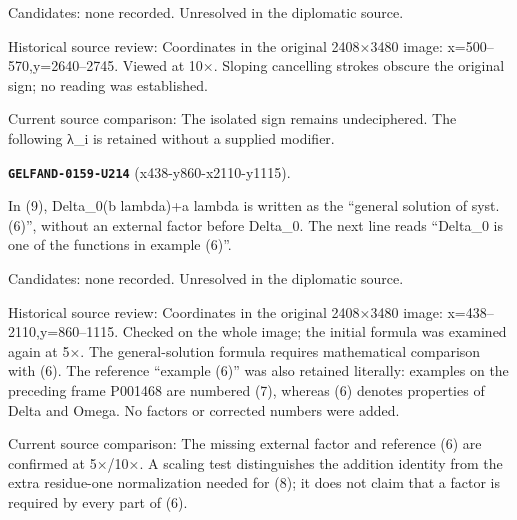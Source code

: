 Candidates: none recorded. Unresolved in the diplomatic source.\par
Historical source review: Coordinates in the original 2408×3480 image: x=500–570,y=2640–2745. Viewed at 10×. Sloping cancelling strokes obscure the original sign; no reading was established.\par
Current source comparison: The isolated sign remains undeciphered. The following λ\_i is retained without a supplied modifier.\par\medskip
\par\noindent\leavevmode{}\label{GELFAND-0159-U214}\label{GELFAND-P001469:x438-y860-x2110-y1115}\textbf{\texttt{GELFAND-0159-U214}} (x438-y860-x2110-y1115).\nopagebreak[4]\par
In (9), Delta\_0(b lambda)+a lambda is written as the “general solution of syst. (6)”, without an external factor before Delta\_0. The next line reads “Delta\_0 is one of the functions in example (6)”.\par
Candidates: none recorded. Unresolved in the diplomatic source.\par
Historical source review: Coordinates in the original 2408×3480 image: x=438–2110,y=860–1115. Checked on the whole image; the initial formula was examined again at 5×. The general-solution formula requires mathematical comparison with (6). The reference “example (6)” was also retained literally: examples on the preceding frame P001468 are numbered (7), whereas (6) denotes properties of Delta and Omega. No factors or corrected numbers were added.\par
Current source comparison: The missing external factor and reference (6) are confirmed at 5×/10×. A scaling test distinguishes the addition identity from the extra residue-one normalization needed for (8); it does not claim that a factor is required by every part of (6).\par\medskip
